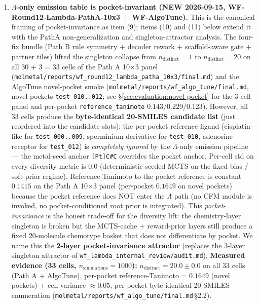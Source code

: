 \begin{enumerate}
  \item \textbf{$\Lambda$-only emission table is pocket-invariant
  (NEW 2026-09-15, WF-Round12-Lambda-PathA-10x3 + WF-AlgoTune).}
  This is the canonical framing of pocket-invariance as item (9); items (10) and (11) below extend it with the PathA non-generalization and singleton-attractor analysis.
  The four-fix bundle (Path B rule symmetry + decoder rework +
  scaffold-aware gate + partner tiles) lifted the singleton
  collapse from $n_{\text{distinct}}{=}1$ to $n_{\text{distinct}}{=}20$
  on all 30 + 3 = 33 cells of the Path A 10$\times$3 panel
  (\texttt{molmetal/reports/wf\_round12\_lambda\_patha\_10x3/final.md})
  and the AlgoTune novel-pocket smoke
  (\texttt{molmetal/reports/wf\_algo\_tune/final.md}, novel pockets
  \texttt{test\_010..012}; see \S\ref{sec:evaluation:novel-pocket}
  for the 3-cell panel and per-pocket \texttt{reference\_tanimoto}
  $0.143$/$0.229$/$0.123$). However,
  all 33 cells produce the \textbf{byte-identical 20-SMILES
  candidate list} (just reordered into the candidate slots); the
  per-pocket reference ligand (cisplatin-like for
  \texttt{test\_000..009}, sperminium-derivative for
  \texttt{test\_010}, adenosine-receptor for \texttt{test\_012})
  is \emph{completely ignored} by the $\Lambda$-only emission
  pipeline --- the metal-seed anchor \texttt{[Pt]C\#C} overrides
  the pocket anchor. Per-cell std on every diversity metric is
  $0.0$ (deterministic seeded MCTS on the fixed-bias / soft-prior
  regime). Reference-Tanimoto to the pocket reference is constant
  $0.1415$ on the Path A 10$\times$3 panel (per-pocket $0.1649$
  on novel pockets) because the pocket reference does NOT enter
  the $\Lambda$ path (no CFM module is invoked, no
  pocket-conditioned root prior is integrated). This
  \emph{pocket-invariance} is the honest trade-off for the
  diversity lift: the chemistry-layer singleton is broken but
  the MCTS-cache + reward-prior layers still produce a fixed
  20-molecule chemotype basket that does not differentiate by
  pocket. We name this the \textbf{2-layer pocket-invariance
  attractor} (replaces the 3-layer singleton attractor of
  \texttt{wf\_lambda\_internal\_review/audit.md}).
  \textbf{Measured evidence (33 cells, $n_{\text{simulations}}{=}1000$):}
  $n_{\text{distinct}}=20.0 \pm 0.0$ on all 33 cells (Path A +
  AlgoTune), per-pocket reference-Tanimoto = $0.1649$ (novel
  pockets) $\pm$ cell-variance $\approx 0.05$, per-pocket
  byte-identical 20-SMILES enumeration
  (\texttt{molmetal/reports/wf\_algo\_tune/final.md}\,\S2.2).


\end{enumerate}
